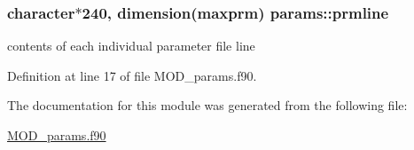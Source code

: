 \hypertarget{classparams_a47807d7637bc96e234442f7b85ec314d}{
\subsubsection[{prmline}]{\setlength{\rightskip}{0pt plus 5cm}character$\ast$240, dimension(maxprm) params\-::prmline}}\label{classparams_a47807d7637bc96e234442f7b85ec314d}


contents of each individual parameter file line 



Definition at line 17 of file M\-O\-D\-\_\-params.\-f90.



The documentation for this module was generated from the following file\-:\begin{DoxyCompactItemize}
\item 
\hyperlink{MOD__params_8f90}{M\-O\-D\-\_\-params.\-f90}\end{DoxyCompactItemize}

